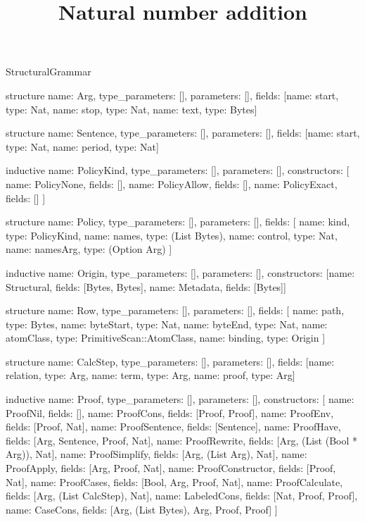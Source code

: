 \begin{lexlean}{StructuralGrammar}
\title{Natural number addition}
\begin{semanticmodule}
structure{
  name: Arg,
  type_parameters: [],
  parameters: [],
  fields: [{name: start, type: Nat}, {name: stop, type: Nat}, {name: text, type: Bytes}]
}

structure{
  name: Sentence,
  type_parameters: [],
  parameters: [],
  fields: [{name: start, type: Nat}, {name: period, type: Nat}]
}

inductive{
  name: PolicyKind,
  type_parameters: [],
  parameters: [],
  constructors: [
    {name: PolicyNone, fields: []},
    {name: PolicyAllow, fields: []},
    {name: PolicyExact, fields: []}
  ]
}

structure{
  name: Policy,
  type_parameters: [],
  parameters: [],
  fields: [
    {name: kind, type: PolicyKind},
    {name: names, type: (List Bytes)},
    {name: control, type: Nat},
    {name: namesArg, type: (Option Arg)}
  ]
}

inductive{
  name: Origin,
  type_parameters: [],
  parameters: [],
  constructors: [{name: Structural, fields: [Bytes, Bytes]}, {name: Metadata, fields: [Bytes]}]
}

structure{
  name: Row,
  type_parameters: [],
  parameters: [],
  fields: [
    {name: path, type: Bytes},
    {name: byteStart, type: Nat},
    {name: byteEnd, type: Nat},
    {name: atomClass, type: PrimitiveScan::AtomClass},
    {name: binding, type: Origin}
  ]
}

structure{
  name: CalcStep,
  type_parameters: [],
  parameters: [],
  fields: [{name: relation, type: Arg}, {name: term, type: Arg}, {name: proof, type: Arg}]
}

inductive{
  name: Proof,
  type_parameters: [],
  parameters: [],
  constructors: [
    {name: ProofNil, fields: []},
    {name: ProofCons, fields: [Proof, Proof]},
    {name: ProofEnv, fields: [Proof, Nat]},
    {name: ProofSentence, fields: [Sentence]},
    {name: ProofHave, fields: [Arg, Sentence, Proof, Nat]},
    {name: ProofRewrite, fields: [Arg, (List (Bool * Arg)), Nat]},
    {name: ProofSimplify, fields: [Arg, (List Arg), Nat]},
    {name: ProofApply, fields: [Arg, Proof, Nat]},
    {name: ProofConstructor, fields: [Proof, Nat]},
    {name: ProofCases, fields: [Bool, Arg, Proof, Nat]},
    {name: ProofCalculate, fields: [Arg, (List CalcStep), Nat]},
    {name: LabeledCons, fields: [Nat, Proof, Proof]},
    {name: CaseCons, fields: [Arg, (List Bytes), Arg, Proof, Proof]}
  ]
}


\end{semanticmodule}
\end{lexlean}
